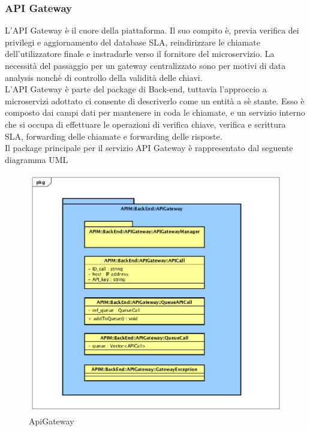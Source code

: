 \subsubsection{API Gateway}

L'API Gateway è il cuore della piattaforma. Il suo compito è, previa verifica dei privilegi e aggiornamento del database SLA, reindirizzare le chiamate dell'utilizzatore finale e instradarle verso il fornitore del microservizio.  La necessità del passaggio per un gateway centralizzato sono per motivi di data analysis nonchè di controllo della validità delle chiavi. \\

L'API Gateway è parte del package di Back-end, tuttavia l'approccio a microservizi adottato ci consente di descriverlo come un entità a sè stante. Esso è composto dai campi dati per mantenere in coda le chiamate, e un servizio interno che si occupa di effettuare le operazioni di verifica chiave, verifica e scrittura SLA, forwarding delle chiamate e forwarding delle risposte.  \\

Il package principale per il servizio API Gateway è rappresentato dal seguente diagramma UML 

\begin{figure}[!htbp]
	\centering
	\includegraphics[scale=0.45]{UML/DiagrammiPackage/ApiGateway.png}
	\caption{ApiGateway}
\end{figure}

